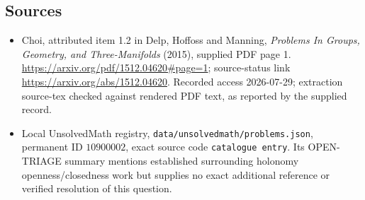 \documentclass[11pt]{article}
\begin{document}
\subsection{Sources}
\begin{itemize}
\item Choi, attributed item 1.2 in Delp, Hoffoss and Manning, \emph{Problems In Groups, Geometry, and Three-Manifolds} (2015), supplied PDF page 1. \url{https://arxiv.org/pdf/1512.04620#page=1}; source-status link \url{https://arxiv.org/abs/1512.04620}. Recorded access 2026-07-29; extraction source-tex checked against rendered PDF text, as reported by the supplied record.
\item Local UnsolvedMath registry, \texttt{data/unsolvedmath/problems.json}, permanent ID \(10900002\), exact source code \texttt{catalogue entry}. Its OPEN-TRIAGE summary mentions established surrounding holonomy openness/closedness work but supplies no exact additional reference or verified resolution of this question.
\end{itemize}
\end{document}
